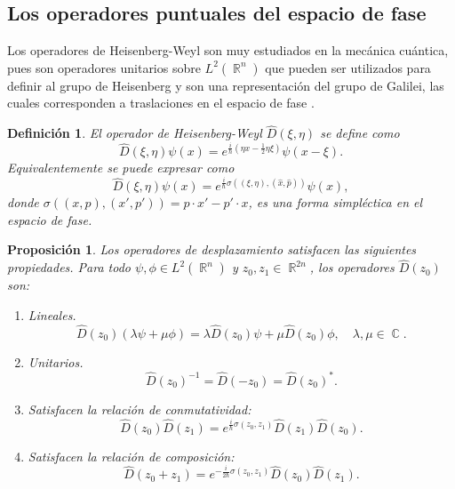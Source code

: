 \documentclass[a4paper]{report}
\DeclareMathOperator{\R}{\mathbb{R}}
\DeclareMathOperator{\C}{\mathbb{C}}
\newtheorem{definition}{Definición}
\newtheorem{proposition}{Proposición}
\begin{document}
  \subsection{Los operadores puntuales del espacio de fase}

  Los operadores de Heisenberg-Weyl son muy estudiados en la
  mecánica cuántica, pues son operadores unitarios sobre
  $L^2(\R^{n})$ que pueden ser utilizados para definir al
  grupo de Heisenberg y son una representación del grupo de
  Galilei, las cuales corresponden a traslaciones en el
  espacio de fase \cite{degosson2011}.
  \begin{definition}
    El operador de Heisenberg-Weyl $\hat{D}(\xi,\eta)$ se
    define como
    \begin{equation}
      \hat{D}(\xi,\eta)\psi(x)
      = e^{\frac{i}{\hbar} (\eta x - \frac{1}{2} \eta
      \xi)}\psi(x - \xi).
    \end{equation} 
    Equivalentemente se puede expresar como
    \begin{equation}
      \hat{D}(\xi,\eta)\psi(x)
      = e^{\frac{i}{\hbar} \sigma((\xi,\eta),
      (\hat{x},\hat{p}))}\psi(x),
    \end{equation} 
    donde $\sigma((x,p),(x',p')) = p \cdot x' - p' \cdot x$,
    es una forma simpléctica en el espacio de fase.
  \end{definition}
  \begin{proposition}
    \label{prop:HW-ops-props}
    Los operadores de desplazamiento satisfacen las
    siguientes propiedades. Para todo $\psi,\phi \in
    L^2(\R^{n})$ y $z_0,z_1 \in \R^{2n}$, los operadores
    $\hat D(z_0)$ son:
    \begin{enumerate}
      \item Lineales.
        \begin{equation}
          \hat D(z_0)(\lambda \psi + \mu \phi)
          = \lambda \hat D(z_0) \psi + \mu \hat D(z_0)\phi,
          \quad
          \lambda, \mu \in \C.
        \end{equation}
      \item Unitarios.
        \begin{equation}
          \hat D(z_0)^{-1}
          = \hat D(-z_0)
          = \hat D(z_0)^{*}.
        \end{equation}
      \item Satisfacen la relación de conmutatividad:
        \begin{equation}
          \hat{D}(z_0)\hat{D}(z_1)
          = e^{\frac{i}{\hbar} \sigma(z_0,z_1)}
          \hat{D}(z_1)\hat{D}(z_0).
        \end{equation}
      \item Satisfacen la relación de composición:
        \begin{equation}
          \hat D(z_0+z_1)
          = e^{-\frac{i}{2\hbar} \sigma(z_0,z_1)}\hat D(z_0)
          \hat D(z_1).
        \end{equation}
    \end{enumerate}
  \end{proposition}
\end{document}
